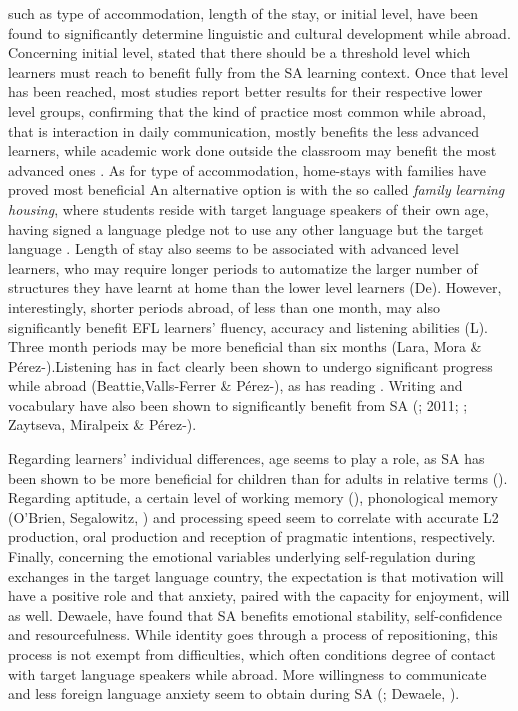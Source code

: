 such as type of accommodation, length of the stay, or initial level, have been found to significantly determine linguistic and cultural development while abroad. Concerning initial level, \citet{Collentine2009} stated that there should be a threshold level which learners must reach to benefit fully from the SA learning context. Once that level has been reached, most studies report better results for their respective lower level groups, confirming that the kind of practice most common while abroad, that is interaction in daily communication, mostly benefits the less advanced learners, while academic work done outside the classroom may benefit the most advanced ones \citep{Kinginger2009}. As for type of accommodation, home-stays with families have proved most beneficial An alternative option is with the so called \textit{family} \textit{learning} \textit{housing}, where students reside with target language speakers of their own age, having signed a language pledge not to use any other language but the target language \citep{Kinginger2015}. Length of stay also seems to be associated with advanced level learners, who may require longer periods to automatize the larger number of structures they have learnt at home than the lower level learners (De\citealt{Keyser2014}). However, interestingly, shorter periods abroad, of less than one month, may also significantly benefit EFL learners’ fluency, accuracy and listening abilities (L\citealt{LanesMuñoz2009}). Three month periods may be more beneficial than six months (Lara, Mora \& Pérez-\citealt{Vidal2016}).Listening has in fact clearly been shown to undergo significant progress while abroad (Beattie,Valls-Ferrer \& Pérez-\citealt{Vidal2014}), as has reading \citep{Dewey2004}. Writing and vocabulary have also been shown to significantly benefit from SA (\citealt{Sasaki2007}; 2011; \citealt{Barquin2012}; Zaytseva, Miralpeix \& Pérez-\citealt{Vidal2018}).

Regarding learners’ individual differences, age seems to play a role, as SA has been shown to be more beneficial for children than for adults in relative terms (\citealt{LlanesMuñoz2013}). Regarding aptitude, a certain level of working memory (\citealt{SundermanKroll2009}), phonological memory (O’Brien, Segalowitz, \citealt{FreedCollentine2007}) and processing speed \citep{Taguchi2008} seem to correlate with accurate L2 production, oral production and reception of pragmatic intentions, respectively. Finally, concerning the emotional variables underlying self-regulation during exchanges in the target language country, the expectation is that motivation will have a positive role and that anxiety, paired with the capacity for enjoyment, will as well. Dewaele, \citet{ComanaruFaraco2015} have found that SA benefits emotional stability, self-confidence and resourcefulness.  While identity goes through a process of repositioning, this process is not exempt from difficulties, which often conditions degree of contact with target language speakers while abroad. More willingness to communicate and less foreign language anxiety seem to obtain during SA (\citealt{DewaeleWei2013}; Dewaele, \citealt{ComanaruFaraco2015}). 

